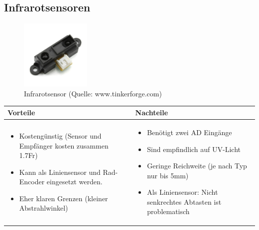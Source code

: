 \pagebreak

\subsection{Infrarotsensoren}
\begin{figure}[h]
	\centering
	\includegraphics[width=0.3\textwidth]{fig/Infrarotsensor.jpg}
	\caption{Infrarotsensor (Quelle: www.tinkerforge.com)}
\end{figure}

\begin{table}[h]
\begin{tabular}{p{} | p{}}


\textbf{Vorteile} & \textbf{Nachteile} \\ \hline
	 
\begin{itemize}
\item Kostengünstig (Sensor und Empfänger kosten zusammen 1.7Fr)
\item Kann als Liniensensor und Rad-Encoder eingesetzt werden.
\item Eher klaren Grenzen (kleiner Abstrahlwinkel)
\end{itemize}
 &
\begin{itemize}
\item Benötigt zwei AD Eingänge
\item Sind empfindlich auf UV-Licht
\item Geringe Reichweite (je nach Typ nur bis 5mm)
\item Als Liniensensor: Nicht senkrechtes Abtasten ist problematisch
\end{itemize}
\end{tabular}
\end{table}


